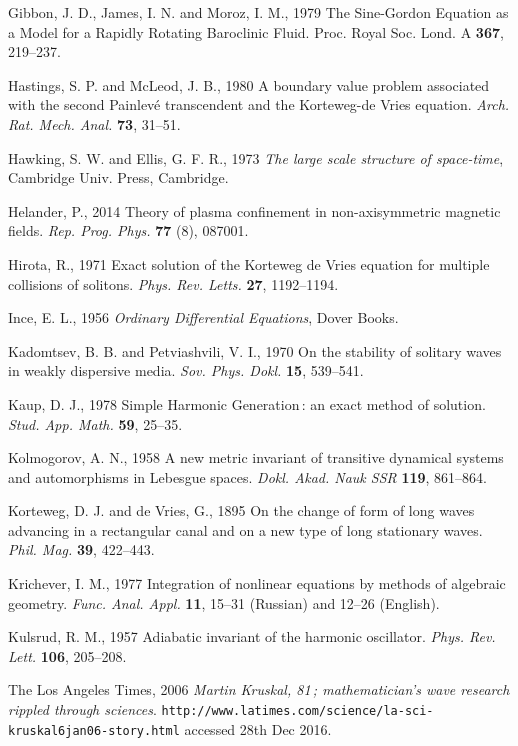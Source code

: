 \documentclass[11pt]{article}
\begin{document}
\begin{thebibliography}{30}
 Gibbon, J. D., James, I. N. and Moroz, I. M., 1979 The Sine-Gordon Equation as a Model for a Rapidly 
Rotating Baroclinic Fluid. {Proc. Royal Soc. Lond. A} \textbf{367}, 219--237. 

 Hastings, S. P. and McLeod, J. B., 1980 A boundary value problem associated with the second Painlev\'e transcendent and the Korteweg-de Vries equation. \textit{Arch. Rat. Mech. Anal.} \textbf{73}, 31--51.

 Hawking, S. W. and Ellis, G. F. R., 1973 \textit{The large scale structure of space-time},  Cambridge 
Univ. Press, Cambridge.

 Helander, P., 2014 Theory of plasma confinement in non-axisymmetric magnetic fields. \textit{Rep. Prog. 
Phys.} \textbf{77} (8), 087001.

 Hirota, R., 1971 Exact solution of the Korteweg de Vries equation for multiple collisions of solitons. 
\textit{Phys. Rev. Letts.} \textbf{27}, 1192--1194.

 Ince, E. L., 1956 \textit{Ordinary Differential Equations}, Dover Books.

 Kadomtsev, B. B. and Petviashvili, V. I., 1970 On the stability of solitary waves in weakly dispersive media. 
\textit{Sov. Phys. Dokl.} \textbf{15}, 539--541. 

 Kaup, D. J., 1978 Simple Harmonic Generation\,: an exact method of solution. \textit{Stud. App. Math.} 
\textbf{59}, 25--35.

 Kolmogorov, A. N., 1958 A new metric invariant of transitive dynamical systems and automorphisms in Lebesgue spaces. \textit{Dokl. Akad. Nauk SSR} \textbf{119}, 861--864.

 Korteweg, D. J. and de Vries, G., 1895 On the change of form of long waves advancing in a rectangular canal 
and on a new type of long stationary waves. \textit{Phil. Mag.} \textbf{39}, 422--443.

 Krichever, I. M., 1977 Integration of nonlinear equations by methods of algebraic geometry. \textit{Func. 
Anal. Appl.} \textbf{11}, 15--31 (Russian) and 12--26 (English). 

 Kulsrud, R. M., 1957 Adiabatic invariant of the harmonic oscillator. \textit{Phys. Rev. Lett.} 
\textbf{106}, 205--208. 

 The Los Angeles Times, 2006 \textit{Martin Kruskal, 81\,; mathematician's wave research rippled through sciences}. \verb+http://www.latimes.com/science/la-sci-kruskal6jan06-story.html+ accessed 28th Dec 2016.


\end{thebibliography}
\end{document}
